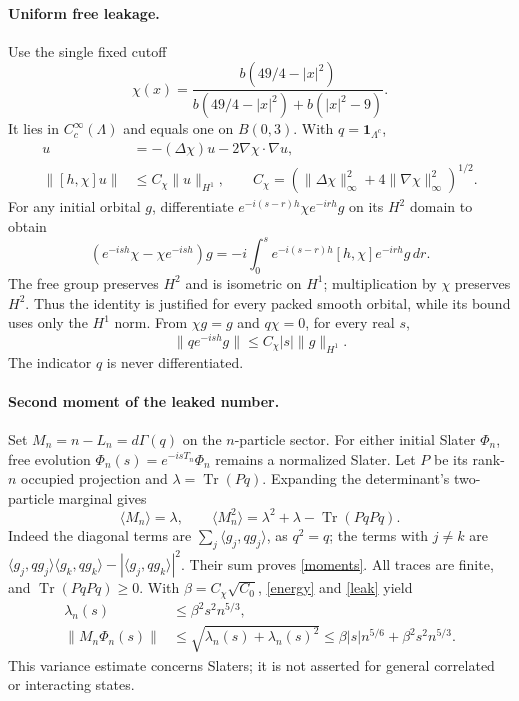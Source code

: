 \documentclass[11pt]{article}
\newcommand{\Tr}{\operatorname{Tr}}
\newcommand{\id}{\mathbf 1}
\begin{document}
\paragraph{Uniform free leakage.}
Use the single fixed cutoff
\[
 \chi(x)=\frac{b(49/4-|x|^2)}{b(49/4-|x|^2)+b(|x|^2-9)} .
\]
It lies in $C_c^\infty(\Lambda)$ and equals one on $B(0,3)$.
With $q=\id_{\Lambda^c}$,
\begin{align}
 [h,\chi]u&=-(\Delta\chi)u-2\nabla\chi\cdot\nabla u,\nonumber\\
 \|[h,\chi]u\|&\leq C_\chi\|u\|_{H^1},\qquad
 C_\chi=(\|\Delta\chi\|_\infty^2+4\|\nabla\chi\|_\infty^2)^{1/2}.
 \label{comm}
\end{align}
For any initial orbital $g$, differentiate
$e^{-i(s-r)h}\chi e^{-irh}g$ on its $H^2$ domain to obtain
\begin{equation}\label{duhcomm}
 (e^{-ish}\chi-\chi e^{-ish})g
 =-i\int_0^s e^{-i(s-r)h}[h,\chi]e^{-irh}g\,dr .
\end{equation}
The free group preserves $H^2$ and is isometric on $H^1$; multiplication by
$\chi$ preserves $H^2$. Thus the identity is justified for every packed
smooth orbital, while its bound uses only the $H^1$ norm. From $\chi g=g$
and $q\chi=0$, for every real $s$,
\begin{equation}\label{leak}
 \|qe^{-ish}g\|\leq C_\chi|s|\|g\|_{H^1} .
\end{equation}
The indicator $q$ is never differentiated.

\paragraph{Second moment of the leaked number.}
Set $M_n=n-L_n=d\Gamma(q)$ on the $n$-particle sector.
For either initial Slater $\Phi_n$, free evolution
$\Phi_n(s)=e^{-isT_n}\Phi_n$ remains a normalized Slater.
Let $P$ be its rank-$n$ occupied projection and $\lambda=\Tr(Pq)$.
Expanding the determinant's two-particle marginal gives
\begin{equation}\label{moments}
 \langle M_n\rangle=\lambda,\qquad
 \langle M_n^2\rangle=\lambda^2+\lambda-\Tr(PqPq).
\end{equation}
Indeed the diagonal terms are $\sum_j\langle g_j,qg_j\rangle$,
as $q^2=q$; the terms with $j\ne k$ are
$\langle g_j,qg_j\rangle\langle g_k,qg_k\rangle-
|\langle g_j,qg_k\rangle|^2$. Their sum proves \eqref{moments}.
All traces are finite, and $\Tr(PqPq)\geq0$. With
$\beta=C_\chi\sqrt{C_0}$, \eqref{energy} and \eqref{leak} yield
\begin{align}
 \lambda_n(s)&\leq\beta^2s^2n^{5/3},\nonumber\\
 \|M_n\Phi_n(s)\|&\leq\sqrt{\lambda_n(s)+\lambda_n(s)^2}
 \leq\beta|s|n^{5/6}+\beta^2s^2n^{5/3}.\label{Mbound}
\end{align}
This variance estimate concerns Slaters; it is not asserted for general
correlated or interacting states.
\end{document}
